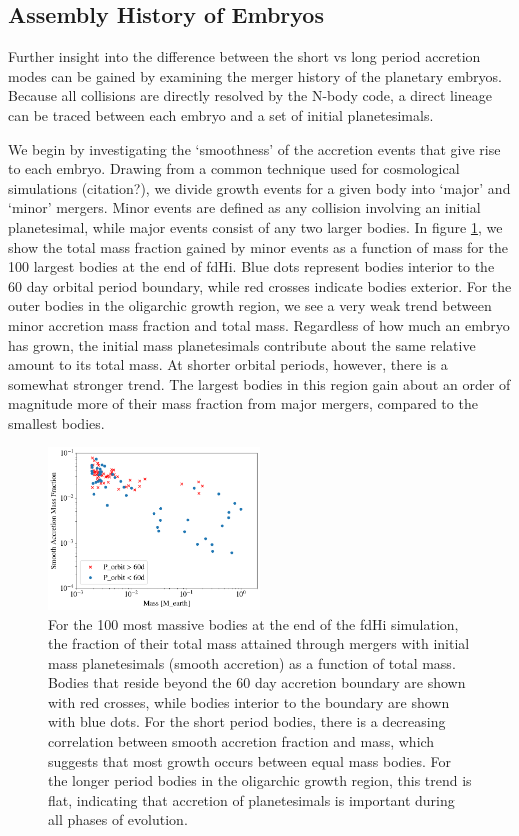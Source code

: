 \documentclass[twocolumn]{aastex63}
\begin{document}
\subsection{Assembly History of Embryos}\label{sec:assembly}

Further insight into the difference between the short vs long period accretion modes can be gained by examining the merger history of the planetary embryos. Because all collisions are directly resolved by the N-body code, a direct lineage can be traced between each embryo and a set of initial planetesimals.

We begin by investigating the `smoothness' of the accretion events that give rise to each embryo. Drawing from a common technique used for cosmological simulations (citation?), we divide growth events for a given body into `major' and `minor' mergers. Minor events are defined as any collision involving an initial planetesimal, while major events consist of any two larger bodies. In figure \ref{fig:minor_frac}, we show the total mass fraction gained by minor events as a function of mass for the 100 largest bodies at the end of fdHi. Blue dots represent bodies interior to the 60 day orbital period boundary, while red crosses indicate bodies exterior. For the outer bodies in the oligarchic growth region, we see a very weak trend between minor accretion mass fraction and total mass. Regardless of how much an embryo has grown, the initial mass planetesimals contribute about the same relative amount to its total mass. At shorter orbital periods, however, there is a somewhat stronger trend. The largest bodies in this region gain about an order of magnitude more of their mass fraction from major mergers, compared to the smallest bodies.

\begin{figure}
\begin{center}
    \includegraphics[width=0.5\textwidth]{figures/minor_frac.png}
    \caption{For the 100 most massive bodies at the end of the fdHi simulation, the fraction of their total mass attained through mergers with initial mass planetesimals (smooth accretion) as a function of total mass. Bodies that reside beyond the 60 day accretion boundary are shown with red crosses, while bodies interior to the boundary are shown with blue dots. For the short period bodies, there is a decreasing correlation between smooth accretion fraction and mass, which suggests that most growth occurs between equal mass bodies. For the longer period bodies in the oligarchic growth region, this trend is flat, indicating that accretion of planetesimals is important during all phases of evolution.\label{fig:minor_frac}}
\end{center}
\end{figure}
\end{document}
